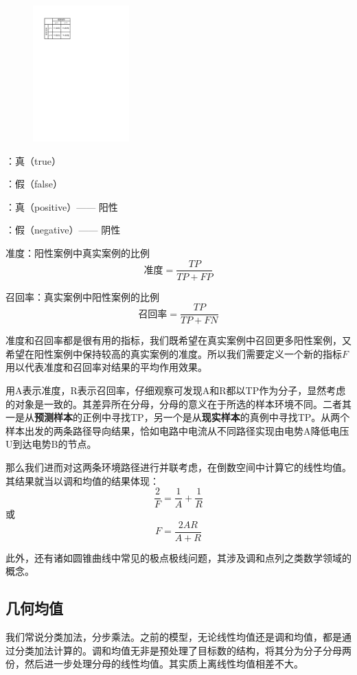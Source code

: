 \documentclass[fontset=none]{ctexart}
\begin{document}
\begin{figure} 
  \centering
  \includegraphics[width=0.33\textwidth]{2.pdf}
  \label{2}
\end{figure}

：真（true）

：假（false）

：真（positive）—— 阳性

：假（negative）—— 阴性


\textbullet 准度：阳性案例中真实案例的比例
	$$\text{准度}=\frac{TP}{TP+FP}$$

\textbullet 召回率：真实案例中阳性案例的比例
	$$\text{召回率}=\frac{TP}{TP+FN}$$

准度和召回率都是很有用的指标，我们既希望在真实案例中召回更多阳性案例，又希望在阳性案例中保持较高的真实案例的准度。所以我们需要定义一个新的指标$F$用以代表准度和召回率对结果的平均作用效果。

用A表示准度，R表示召回率，仔细观察可发现A和R都以TP作为分子，显然考虑的对象是一致的。其差异所在分母，分母的意义在于所选的样本环境不同。二者其一是从\textbf{预测样本}的正例中寻找TP，另一个是从\textbf{现实样本}的真例中寻找TP。从两个样本出发的两条路径导向结果，恰如电路中电流从不同路径实现由电势A降低电压U到达电势B的节点。

那么我们进而对这两条环境路径进行并联考虑，在倒数空间中计算它的线性均值。其结果就当以调和均值的结果体现：$$\frac{2}{F}=\frac{1}{A}+\frac{1}{R}$$或$$F=\frac{2AR}{A+R}$$

\kaishu
此外，还有诸如圆锥曲线中常见的极点极线问题，其涉及调和点列之类数学领域的概念。

\subsection{几何均值}

\kaishu
我们常说分类加法，分步乘法。之前的模型，无论线性均值还是调和均值，都是通过分类加法计算的。调和均值无非是预处理了目标数的结构，将其分为分子分母两份，然后进一步处理分母的线性均值。其实质上离线性均值相差不大。
\end{document}
